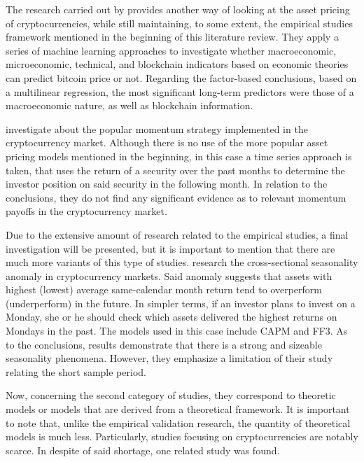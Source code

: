 The research carried out by \parencite{Erfanian2022} provides another way of looking at the asset pricing of cryptocurrencies, while still maintaining, to some extent, the empirical studies framework mentioned in the beginning of this literature review. They apply a series of machine learning approaches to investigate whether macroeconomic, microeconomic, technical, and blockchain indicators based on economic theories can predict bitcoin price or not. Regarding the factor-based conclusions, based on a multilinear regression, the most significant long-term predictors were those of a macroeconomic nature, as well as blockchain information. 

\parencite{GROBYS20196} investigate about the popular momentum strategy implemented in the cryptocurrency market. Although there is no use of the more popular asset pricing models mentioned in the beginning, in this case a time series approach is taken, that uses the return of a security over the past months to determine the investor position on said security in the following month. In relation to the conclusions, they do not find any significant evidence as to relevant momentum payoffs in the cryptocurrency market.

Due to the extensive amount of research related to the empirical studies, a final investigation will be presented, but it is important to mention that there are much more variants of this type of studies. \parencite{Long2020} research the cross-sectional seasonality anomaly in cryptocurrency markets. Said anomaly suggests that assets with highest (lowest) average same-calendar month return tend to overperform (underperform) in the future. In simpler terms, if an investor plans to invest on a Monday, she or he should check which assets delivered the highest returns on Mondays in the past. The models used in this case include CAPM and FF3. As to the conclusions, results demonstrate that there is a strong and sizeable seasonality phenomena. However, they emphasize a limitation of their study relating the short sample period.

Now, concerning the second category of studies, they correspond to theoretic models or models that are derived from a theoretical framework. It is important to note that, unlike the empirical validation research, the quantity of theoretical models is much less. Particularly, studies focusing on cryptocurrencies are notably scarce. In despite of said shortage, one related study was found.

